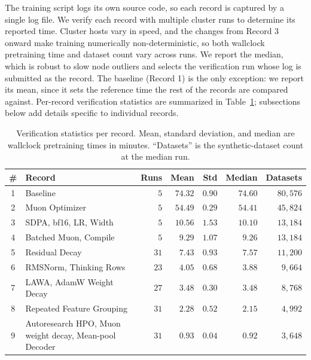 \documentclass{article}
\theoremstyle{plain}
\theoremstyle{definition}
\theoremstyle{remark}
\begin{document}
The training script logs its own source code, so each record is captured by a single log file.
We verify each record with multiple cluster runs to determine its reported time.
Cluster hosts vary in speed, and the changes from Record 3 onward make training numerically non-deterministic, so both wallclock pretraining time and dataset count vary across runs.
We report the median, which is robust to slow node outliers and selects the verification run whose log is submitted as the record.
The baseline (Record 1) is the only exception: we report its mean, since it sets the reference time the rest of the records are compared against.
Per-record verification statistics are summarized in Table~\ref{tab:record-stats}; subsections below add details specific to individual records.

\begin{table}[h]
\centering
\small
\caption{Verification statistics per record. Mean, standard deviation, and median are wallclock pretraining times in minutes. ``Datasets'' is the synthetic-dataset count at the median run.}
\label{tab:record-stats}
\begin{tabular}{@{}clrrrrr@{}}
  \toprule
  \# & Record & Runs & Mean & Std & Median & Datasets \\
  \midrule
  1 & Baseline                     & $5$  & $74.32$ & $0.90$ & $74.60$ & $80{,}576$ \\
  2 & Muon Optimizer               & $5$  & $54.49$ & $0.29$ & $54.41$ & $45{,}824$ \\
  3 & SDPA, bf16, LR, Width        & $5$  & $10.56$ & $1.53$ & $10.10$ & $13{,}184$ \\
  4 & Batched Muon, Compile        & $5$  & $\phantom{0}9.29$  & $1.07$ & $\phantom{0}9.26$  & $13{,}184$ \\
  5 & Residual Decay               & $31$ & $\phantom{0}7.43$  & $0.93$ & $\phantom{0}7.57$  & $11{,}200$ \\
  6 & RMSNorm, Thinking Rows       & $23$ & $\phantom{0}4.05$  & $0.68$ & $\phantom{0}3.88$  & $\phantom{0}9{,}664$ \\
  7 & LAWA, AdamW Weight Decay     & $27$ & $\phantom{0}3.48$  & $0.30$ & $\phantom{0}3.48$  & $\phantom{0}8{,}768$ \\
  8 & Repeated Feature Grouping    & $31$ & $\phantom{0}2.28$  & $0.52$ & $\phantom{0}2.15$  & $\phantom{0}4{,}992$ \\
  9 & Autoresearch HPO, Muon weight decay, Mean-pool Decoder & $31$ & $\phantom{0}0.93$  & $0.04$ & $\phantom{0}0.92$  & $\phantom{0}3{,}648$ \\
  \bottomrule
\end{tabular}
\end{table}
\end{document}
